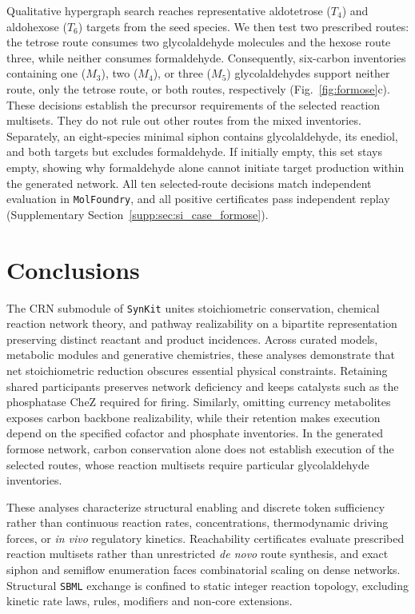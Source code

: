 \documentclass[10pt,a4paper,fleqn]{article}
\newcommand{\synkit}{\texttt{SynKit}\xspace}
\begin{document}
Qualitative hypergraph search reaches representative aldotetrose ($T_4$) and aldohexose ($T_6$) targets from the seed species. We then test two prescribed routes: the tetrose route consumes two glycolaldehyde molecules and the hexose route three, while neither consumes formaldehyde. Consequently, six-carbon inventories containing one ($M_3$), two ($M_4$), or three ($M_5$) glycolaldehydes support neither route, only the tetrose route, or both routes, respectively (Fig.~\ref{fig:formose}c). These decisions establish the precursor requirements of the selected reaction multisets. They do not rule out other routes from the mixed inventories. Separately, an eight-species minimal siphon contains glycolaldehyde, its enediol, and both targets but excludes formaldehyde. If initially empty, this set stays empty, showing why formaldehyde alone cannot initiate target production within the generated network. All ten selected-route decisions match independent evaluation in \texttt{MolFoundry}, and all positive certificates pass independent replay (Supplementary Section~\ref{supp:sec:si_case_formose}).

\section{Conclusions}
\label{sec:discussion}

The CRN submodule of \synkit unites stoichiometric conservation, chemical reaction network theory, and pathway realizability on a bipartite representation preserving distinct reactant and product incidences. Across curated models, metabolic modules and generative chemistries, these analyses demonstrate that net stoichiometric reduction obscures essential physical constraints. Retaining shared participants preserves network deficiency and keeps catalysts such as the phosphatase CheZ required for firing. Similarly, omitting currency metabolites exposes carbon backbone realizability, while their retention makes execution depend on the specified cofactor and phosphate inventories. In the generated formose network, carbon conservation alone does not establish execution of the selected routes, whose reaction multisets require particular glycolaldehyde inventories.

These analyses characterize structural enabling and discrete token sufficiency rather than continuous reaction rates, concentrations, thermodynamic driving forces, or \textit{in vivo} regulatory kinetics. Reachability certificates evaluate prescribed reaction multisets rather than unrestricted \textit{de novo} route synthesis, and exact siphon and semiflow enumeration faces combinatorial scaling on dense networks. Structural \texttt{SBML} exchange is confined to static integer reaction topology, excluding kinetic rate laws, rules, modifiers and non-core extensions.
\end{document}
